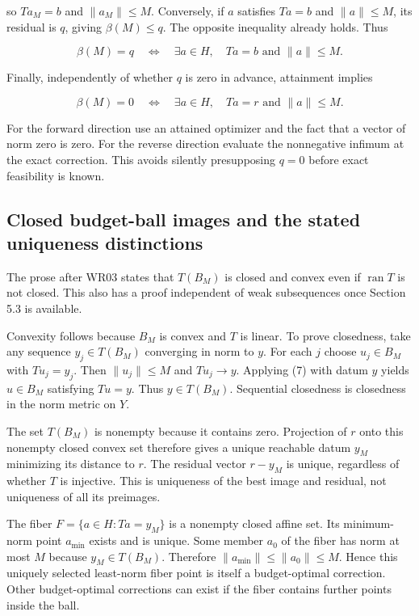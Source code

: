 \documentclass[11pt]{article}
\begin{document}
so \(Ta_M = b\) and \(\|a_M\| \le M\). Conversely, if \(a\) satisfies
\(Ta = b\) and \(\|a\| \le M\), its residual is \(q\), giving
\(\beta(M) \le q\). The opposite inequality already holds. Thus

\[
\beta(M)=q
\quad\Longleftrightarrow\quad
\exists a\in H,\quad Ta=b\text{ and }\|a\|\le M.    \tag{18}
\]

Finally, independently of whether \(q\) is zero in advance, attainment
implies

\[
\beta(M)=0
\quad\Longleftrightarrow\quad
\exists a\in H,\quad Ta=r\text{ and }\|a\|\le M.    \tag{19}
\]

For the forward direction use an attained optimizer and the fact that a
vector of norm zero is zero. For the reverse direction evaluate the
nonnegative infimum at the exact correction. This avoids silently
presupposing \(q = 0\) before exact feasibility is known.

\hypertarget{closed-budget-ball-images-and-the-stated-uniqueness-distinctions}{%
\subsection{Closed budget-ball images and the stated uniqueness
distinctions}\label{closed-budget-ball-images-and-the-stated-uniqueness-distinctions}}

The prose after WR03 states that \(T(B_M)\) is closed and convex even if
\(\operatorname{ran} T\) is not closed. This also has a proof
independent of weak subsequences once Section 5.3 is available.

Convexity follows because \(B_M\) is convex and \(T\) is linear. To
prove closedness, take any sequence \(y_j \in T(B_M)\) converging in
norm to \(y\). For each \(j\) choose \(u_j \in B_M\) with
\(Tu_j = y_j\). Then \(\|u_j\| \le M\) and \(Tu_j \to y\). Applying (7)
with datum \(y\) yields \(u \in B_M\) satisfying \(Tu = y\). Thus
\(y \in T(B_M)\). Sequential closedness is closedness in the norm metric
on \(Y\).

The set \(T(B_M)\) is nonempty because it contains zero. Projection of
\(r\) onto this nonempty closed convex set therefore gives a unique
reachable datum \(y_M\) minimizing its distance to \(r\). The residual
vector \(r-y_M\) is unique, regardless of whether \(T\) is injective.
This is uniqueness of the best image and residual, not uniqueness of all
its preimages.

The fiber \(F = \{a \in H : Ta = y_M\}\) is a nonempty closed affine
set. Its minimum-norm point \(a_{\mathrm{min}}\) exists and is unique.
Some member \(a_0\) of the fiber has norm at most \(M\) because
\(y_M \in T(B_M)\). Therefore
\(\|a_{\mathrm{min}}\| \le \|a_0\| \le M\). Hence this uniquely selected
least-norm fiber point is itself a budget-optimal correction. Other
budget-optimal corrections can exist if the fiber contains further
points inside the ball.
\end{document}
